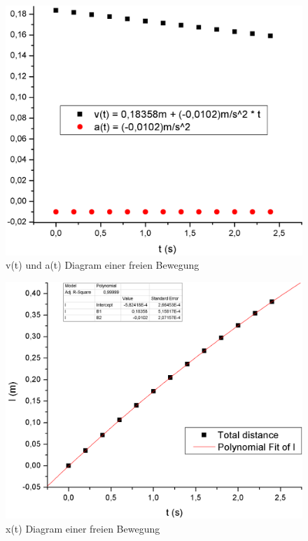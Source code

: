 \documentclass[12pt,a4paper]{article}
\begin{document}
\begin{figure}[H]
	\centering
	\includegraphics[scale=0.4]{./figure/v(t)_a(t)_diagram_freie_bew.png}
	\caption{v(t) und a(t) Diagram einer freien Bewegung}
	\label{fig:v_t_a_t_freie_bew}
\end{figure}

\begin{figure}[H]
	\centering
	\includegraphics[scale=0.4]{./figure/x(t)_diagram_freie_bew.png}
	\caption{x(t) Diagram einer freien Bewegung}
	\label{fig:x_t_freie_bew}
\end{figure}
\end{document}
